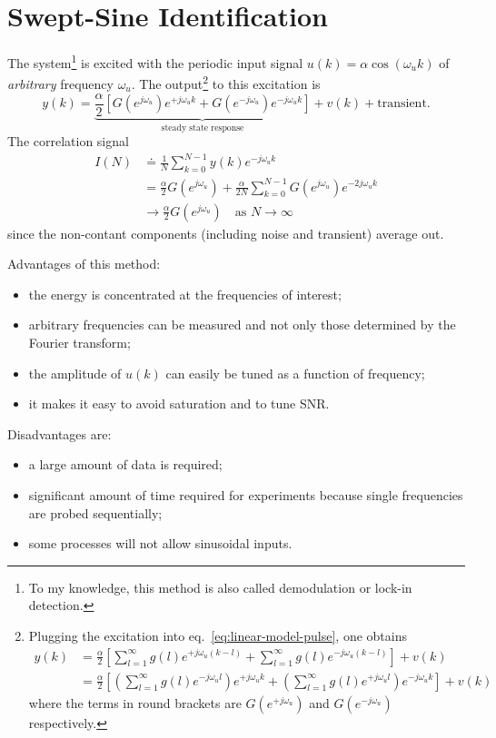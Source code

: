 \section{Swept-Sine Identification}
\label{sec:swept-sine-identification}

The system\footnote{To my knowledge, this method is also called demodulation or lock-in detection.} is excited with the periodic input signal $u(k)=\alpha \cos(\omega_uk)$ of \emph{arbitrary} frequency $\omega_u$. The output\footnote{Plugging the excitation into eq.~\eqref{eq:linear-model-pulse}, one obtains
  \begin{align*}
    y(k) &= \frac{\alpha}{2}\left[\sum_{l=1}^\infty g(l) e^{+j\omega_u(k-l)} + \sum_{l=1}^\infty g(l) e^{-j\omega_u(k-l)}\right] + v(k) \\
         &= \frac{\alpha}{2}\left[\left(\sum_{l=1}^\infty g(l) e^{-j\omega_ul}\right) e^{+j\omega_uk} + \left(\sum_{l=1}^\infty g(l) e^{+j\omega_ul}\right) e^{-j\omega_uk}\right] + v(k)
  \end{align*}
  where the terms in round brackets are $G(e^{+j\omega_u})$ and $G(e^{-j\omega_u})$ respectively.} to this excitation is
\begin{equation*}
  y(k) = \underbrace{\frac{\alpha}{2} \left[G(e^{j\omega_u})e^{+j\omega_uk} + G(e^{-j\omega_u})e^{-j\omega_uk}\right]}_\text{steady state response} + v(k) + \text{transient}.
\end{equation*}
The correlation signal
\begin{align*}
  I(N) &\doteq \frac{1}{N}\sum_{k=0}^{N-1}y(k)e^{-j\omega_u k} \\
       &= \frac{\alpha}{2} G(e^{j\omega_u}) + \frac{\alpha}{2N} \sum_{k=0}^{N-1} G(e^{j\omega_u})e^{-2j\omega_u k} \\
       &\rightarrow \frac{\alpha}{2} G(e^{j\omega_u})\hspace{1em} \text{as } N\rightarrow \infty
\end{align*}
since the non-contant components (including noise and transient) average out.

Advantages of this method:
\begin{itemize}
  \itemsep0em
\item the energy is concentrated at the frequencies of interest;
\item arbitrary frequencies can be measured and not only those determined by the Fourier transform;
\item the amplitude of $u(k)$ can easily be tuned as a function of frequency;
\item it makes it easy to avoid saturation and to tune SNR.
\end{itemize}
Disadvantages are:
\begin{itemize}
  \itemsep0em
\item a large amount of data is required;
\item significant amount of time required for experiments because single frequencies are probed sequentially;
\item some processes will not allow sinusoidal inputs.
\end{itemize}


